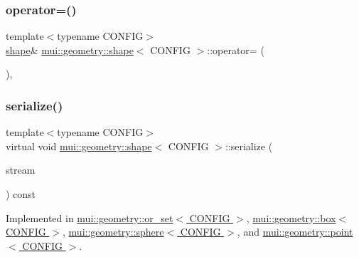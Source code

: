 \mbox{\label{classmui_1_1geometry_1_1shape_a16b649150ac5c7a6250cf89a646b6470}} 
\subsubsection{\texorpdfstring{operator=()}{operator=()}\hspace{0.1cm}{\footnotesize\ttfamily [2/2]}}
{\footnotesize\ttfamily template$<$typename C\+O\+N\+F\+IG$>$ \\
\hyperlink{classmui_1_1geometry_1_1shape}{shape}\& \hyperlink{classmui_1_1geometry_1_1shape}{mui\+::geometry\+::shape}$<$ C\+O\+N\+F\+IG $>$\+::operator= (\begin{DoxyParamCaption}\item[{const \hyperlink{classmui_1_1geometry_1_1shape}{shape}$<$ C\+O\+N\+F\+IG $>$ \&}]{ }\end{DoxyParamCaption})\hspace{0.3cm}{\ttfamily [protected]}, {\ttfamily [default]}}

\mbox{\label{classmui_1_1geometry_1_1shape_ab1b2e763113b96dd0ae3deedfa0e7d22}} 
\subsubsection{\texorpdfstring{serialize()}{serialize()}}
{\footnotesize\ttfamily template$<$typename C\+O\+N\+F\+IG$>$ \\
virtual void \hyperlink{classmui_1_1geometry_1_1shape}{mui\+::geometry\+::shape}$<$ C\+O\+N\+F\+IG $>$\+::serialize (\begin{DoxyParamCaption}\item[{\hyperlink{classmui_1_1ostream}{ostream} \&}]{stream }\end{DoxyParamCaption}) const\hspace{0.3cm}{\ttfamily [pure virtual]}}



Implemented in \hyperlink{classmui_1_1geometry_1_1or__set_ae761a2812fb9749e7df978a50b72cd76}{mui\+::geometry\+::or\+\_\+set$<$ C\+O\+N\+F\+I\+G $>$}, \hyperlink{classmui_1_1geometry_1_1box_aea666920fb81b48c7561df7d7da8a0d6}{mui\+::geometry\+::box$<$ C\+O\+N\+F\+I\+G $>$}, \hyperlink{classmui_1_1geometry_1_1sphere_a5f937c4e7878adb9cc8d07b7b9b76131}{mui\+::geometry\+::sphere$<$ C\+O\+N\+F\+I\+G $>$}, and \hyperlink{classmui_1_1geometry_1_1point_aebeb572c611a8179a16e9a8ecd8b9e61}{mui\+::geometry\+::point$<$ C\+O\+N\+F\+I\+G $>$}.

